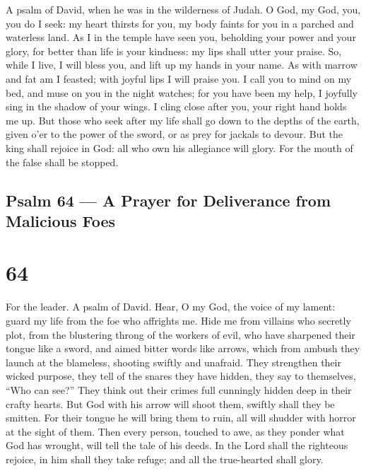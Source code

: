 A psalm of David, when he was in the wilderness of Judah.  O
God, my God, you, you do I seek: my heart thirsts for you, my body
faints for you in a parched and waterless land.  As I in the
temple have seen you, beholding your power and your glory, 
for better than life is your kindness: my lips shall utter your praise.
 So, while I live, I will bless you, and lift up my hands in
your name.  As with marrow and fat am I feasted; with joyful
lips I will praise you.  I call you to mind on my bed, and
muse on you in the night watches;  for you have been my
help, I joyfully sing in the shadow of your wings.  I cling
close after you, your right hand holds me up.  But those who
seek after my life shall go down to the depths of the earth,
 given o'er to the power of the sword, or as prey for
jackals to devour.  But the king shall rejoice in God: all
who own his allegiance will glory. For the mouth of the false shall be
stopped.

\hypertarget{psalm-64-a-prayer-for-deliverance-from-malicious-foes}{%
\subsection{Psalm 64 --- A Prayer for Deliverance from Malicious
Foes}\label{psalm-64-a-prayer-for-deliverance-from-malicious-foes}}

\hypertarget{section-63}{%
\section{64}\label{section-63}}

For the leader. A psalm of David.  Hear, O my God, the voice
of my lament: guard my life from the foe who affrights me. 
Hide me from villains who secretly plot, from the blustering throng of
the workers of evil,  who have sharpened their tongue like a
sword, and aimed bitter words like arrows,  which from
ambush they launch at the blameless, shooting swiftly and unafraid.
 They strengthen their wicked purpose, they tell of the
snares they have hidden, they say to themselves, ``Who can see?''
 They think out their crimes full cunningly hidden deep in
their crafty hearts.  But God with his arrow will shoot
them, swiftly shall they be smitten.  For their tongue he
will bring them to ruin, all will shudder with horror at the sight of
them.  Then every person, touched to awe, as they ponder
what God has wrought, will tell the tale of his deeds.  In
the Lord shall the righteous rejoice, in him shall they take refuge; and
all the true-hearted shall glory.

